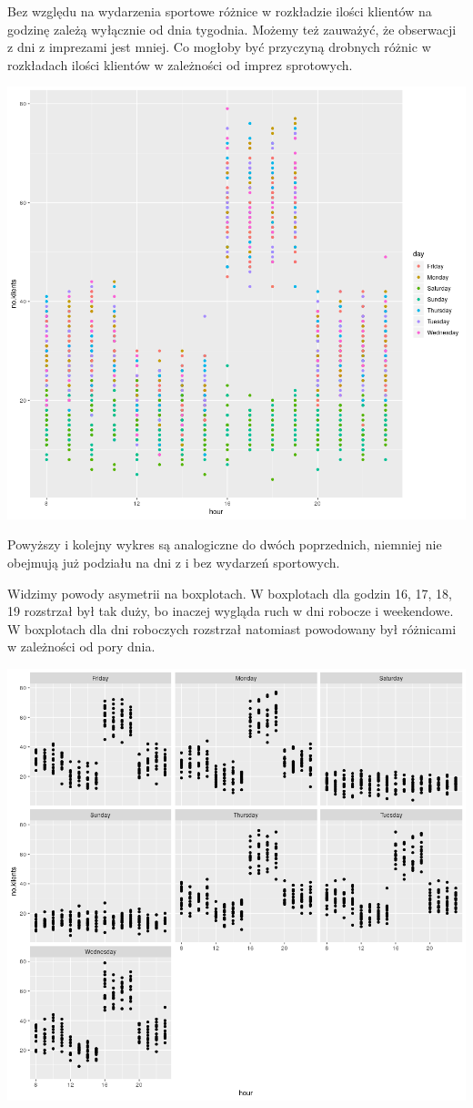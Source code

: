 \documentclass[a4paper,11pt]{article}
\begin{document}
Bez względu na wydarzenia sportowe różnice w rozkładzie ilości klientów na godzinę zależą wyłącznie od dnia tygodnia. Możemy też zauważyć, że obserwacji z dni z imprezami jest mniej. Co  mogłoby być przyczyną drobnych różnic w rozkładach ilości klientów w zależności od imprez sprotowych.

\includegraphics[scale=.7]{plot3.png} 

Powyższy i kolejny wykres są analogiczne do  dwóch poprzednich, niemniej nie obejmują już podziału na dni z i bez wydarzeń sportowych. 

Widzimy powody asymetrii na boxplotach. W boxplotach dla godzin 16,  17, 18,  19 rozstrzał był tak duży, bo inaczej wygląda ruch w dni robocze i weekendowe. W boxplotach dla dni roboczych rozstrzał natomiast powodowany był różnicami w zależności od pory dnia. 

\includegraphics[scale=.7]{plot4.png} 
\end{document}

